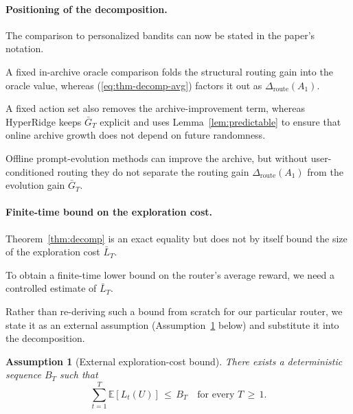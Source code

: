 \documentclass{article} %
\newtheorem{assumption}{Assumption}
\providecommand{\E}{\mathbb{E}}
\renewcommand{\eqref}[1]{\textup{(\ref{#1})}}
\begin{document}
\paragraph{Positioning of the decomposition.}
The comparison to personalized bandits can now be stated in the paper's notation.

A fixed in-archive oracle comparison folds the structural routing gain into the oracle value, whereas \eqref{eq:thm-decomp-avg} factors it out as $\Delta_{\mathrm{route}}(A_1)$.

A fixed action set also removes the archive-improvement term, whereas HyperRidge keeps $\bar G_T$ explicit and uses Lemma~\ref{lem:predictable} to ensure that online archive growth does not depend on future randomness.

Offline prompt-evolution methods can improve the archive, but without user-conditioned routing they do not separate the routing gain $\Delta_{\mathrm{route}}(A_1)$ from the evolution gain $\bar G_T$.

\paragraph{Finite-time bound on the exploration cost.}

\label{sec:method-plugin}

Theorem~\ref{thm:decomp} is an exact equality but does not by itself bound the size of the exploration cost $\bar L_T$.

To obtain a finite-time lower bound on the router's average reward, we need a controlled estimate of $\bar L_T$.

Rather than re-deriving such a bound from scratch for our particular router, we state it as an external assumption (Assumption~\ref{ass:Bt} below) and substitute it into the decomposition.

\begin{assumption}[External exploration-cost bound]
\label{ass:Bt}
There exists a deterministic sequence $B_T$ such that
\begin{equation}
\label{eq:ass-Bt}
\sum_{t=1}^T \E[L_t(U)] \,\le\, B_T \quad \text{for every } T \,\ge\, 1.
\end{equation}
\end{assumption}
\end{document}
